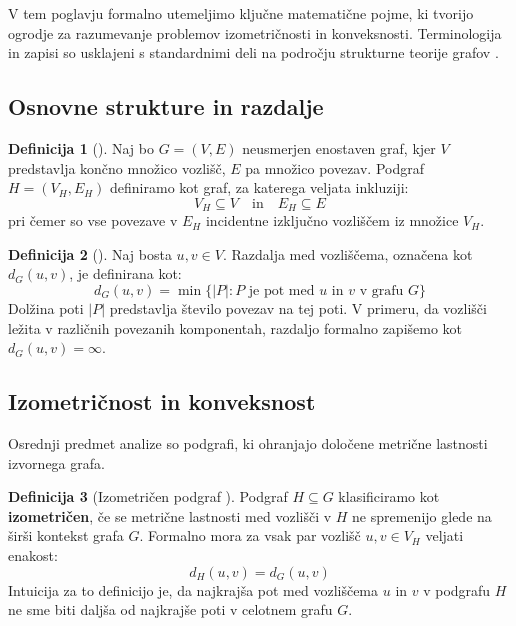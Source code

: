 \documentclass[sigconf
]{acmart}
\theoremstyle{definition}
\newtheorem{definition}{Definicija}[section]
\begin{document}
V tem poglavju formalno utemeljimo ključne matematične pojme, ki tvorijo ogrodje za razumevanje problemov izometričnosti in konveksnosti. Terminologija in zapisi so usklajeni s standardnimi deli na področju strukturne teorije grafov \cite{imrich2000}.

\subsection{Osnovne strukture in razdalje}

\begin{definition}[\cite{imrich2000}]
Naj bo $G = (V, E)$ neusmerjen enostaven graf, kjer $V$ predstavlja končno množico vozlišč, $E$ pa množico povezav. Podgraf $H = (V_H, E_H)$ definiramo kot graf, za katerega veljata inkluziji:
\[ V_H \subseteq V \quad \text{in} \quad E_H \subseteq E \]
pri čemer so vse povezave v $E_H$ incidentne izključno vozliščem iz množice $V_H$.
\end{definition}

\begin{definition}[\cite{winkler1984}]
Naj bosta $u, v \in V$. Razdalja med vozliščema, označena kot $d_G(u, v)$, je definirana kot:
\[ d_G(u, v) = \min \{ |P| : P \text{ je pot med } u \text{ in } v \text{ v grafu } G \} \]
Dolžina poti $|P|$ predstavlja število povezav na tej poti. V primeru, da vozlišči ležita v različnih povezanih komponentah, razdaljo formalno zapišemo kot $d_G(u, v) = \infty$.
\end{definition}

\subsection{Izometričnost in konveksnost}

Osrednji predmet analize so podgrafi, ki ohranjajo določene metrične lastnosti izvornega grafa. 

\begin{definition}[Izometričen podgraf \cite{djokovic1973}]
Podgraf $H \subseteq G$ klasificiramo kot \textbf{izometričen}, če se metrične lastnosti med vozlišči v $H$ ne spremenijo glede na širši kontekst grafa $G$. Formalno mora za vsak par vozlišč $u, v \in V_H$ veljati enakost:
\begin{equation}
    d_H(u, v) = d_G(u, v)
\end{equation}
Intuicija za to definicijo je, da najkrajša pot med vozliščema $u$ in $v$ v podgrafu $H$ ne sme biti daljša od najkrajše poti v celotnem grafu $G$.
\end{definition}
\end{document}
